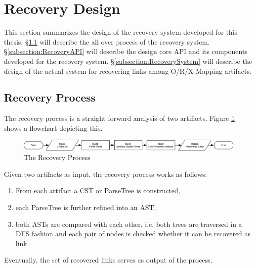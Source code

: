 \section{Recovery Design}
\label{section:RecoverySystemDesign}
This section summarizes the design of the recovery system developed for this thesis.
§\ref{subsection:RecoveryProcess} will describe the all over process of the recovery system.
§\ref{subsection:RecoveryAPI} will describe the design core \gls{API} and its components developed for the recovery system.
§\ref{subsection:RecoverySystem} will describe the design of the actual system for recovering links among \gls{O/R/X-Mapping} artifacts.


\subsection{Recovery Process}
\label{subsection:RecoveryProcess}
The recovery process is a straight forward analysis of two artifacts.
Figure \ref{figure:RecovryProcess} shows a flowchart depicting this.
\begin{figure}[h!]
\begin{center}
\includegraphics[width=\textwidth]{images/RecoveryProcess.png}
\end{center}
\caption{The Recovery Process}
\label{figure:RecovryProcess}
\end{figure}
Given two artifacts as input, the recovery process works as follows:
\begin{enumerate}
\item
From each artifact a \gls{CST} or \gls{ParseTree} is constructed,
\item
each \gls{ParseTree} is further refined into an \gls{AST},
\item
both \glspl{AST} are compared with each other, i.e. both trees are traversed in a \gls{DFS} fashion and each pair of nodes is checked whether it can be recovered as link.
\end{enumerate}
Eventually, the set of recovered links serves as output of the process.

